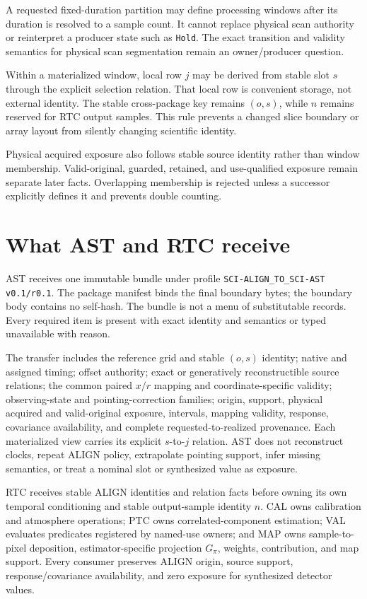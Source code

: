 \documentclass[10pt]{article}
\newcommand{\code}[1]{\nolinkurl{#1}}
\begin{document}
A requested fixed-duration partition may define processing windows after its
duration is resolved to a sample count.  It cannot replace physical scan
authority or reinterpret a producer state such as \code{Hold}.  The exact
transition and validity semantics for physical scan segmentation remain an
owner/producer question.

Within a materialized window, local row \(j\) may be derived from stable slot
\(s\) through the explicit selection relation.  That local row is convenient
storage, not external identity.  The stable cross-package key remains
\((o,s)\), while \(n\) remains reserved for RTC output samples.  This rule
prevents a changed slice boundary or array layout from silently changing
scientific identity.

Physical acquired exposure also follows stable source identity rather than
window membership.  Valid-original, guarded, retained, and use-qualified
exposure remain separate later facts.  Overlapping membership is rejected
unless a successor explicitly defines it and prevents double counting.

\clearpage
\section{What AST and RTC receive}

AST receives one immutable bundle under profile
\code{SCI-ALIGN_TO_SCI-AST v0.1/r0.1}.  The package manifest binds the final
boundary bytes; the boundary body contains no self-hash.  The bundle is not a
menu of substitutable records.  Every required item is present with exact
identity and semantics or typed unavailable with reason.

The transfer includes the reference grid and stable \((o,s)\) identity;
native and assigned timing; offset authority; exact or generatively
reconstructible source relations; the common paired \(x/r\) mapping and
coordinate-specific validity; observing-state and pointing-correction
families; origin, support, physical acquired and valid-original exposure,
intervals, mapping validity, response,
covariance availability, and complete requested-to-realized provenance.  Each
materialized view carries its explicit \(s\)-to-\(j\) relation.  AST does not
reconstruct clocks, repeat ALIGN policy, extrapolate pointing support, infer
missing semantics, or treat a nominal slot or synthesized value as exposure.

RTC receives stable ALIGN identities and relation facts before owning its own
temporal conditioning and stable output-sample identity \(n\).  CAL owns
calibration and atmosphere operations; PTC owns correlated-component
estimation; VAL evaluates predicates registered by named-use owners; and MAP
owns sample-to-pixel deposition, estimator-specific projection \(G_\pi\),
weights, contribution, and map support.  Every consumer preserves ALIGN
origin, source support, response/covariance availability, and zero exposure
for synthesized detector values.
\end{document}
